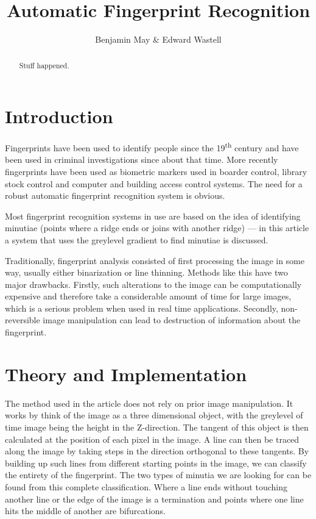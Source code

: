 \documentclass[11pt,a4paper]{article}
\title{Automatic Fingerprint Recognition}
\author{Benjamin May \& Edward Wastell}
\begin{document}
    \maketitle

    \begin{abstract}
      Stuff happened.
    \end{abstract}

    \begin{multicols}{2}

\section{Introduction}
	Fingerprints have been used to identify people since the 19\textsuperscript{th} century and have been used in criminal investigations since about that time. More recently fingerprints have been used as biometric markers used in boarder control, library stock control and computer and building access control systems. The need for a robust automatic fingerprint recognition system is obvious.

	Most fingerprint recognition systems in use are based on the idea of identifying minutiae (points where a ridge ends or joins with another ridge) --- in this article a system that uses the greylevel gradient to find minutiae is discussed.

        Traditionally, fingerprint analysis consisted of first processing the image in some way, usually either binarization or line thinning. Methods like this have two major drawbacks. Firstly, such alterations to the image can be computationally expensive and therefore take a considerable amount of time for large images, which is a serious problem when used in real time applications. Secondly, non-reversible image manipulation can lead to destruction of information about the fingerprint.


\section{Theory and Implementation}

        The method used in the article does not rely on prior image manipulation. It works by think of the image as a three dimensional object, with the greylevel of time image being the height in the Z-direction. The tangent of this object is then calculated at the position of each pixel in the image. A line can then be traced along the image by taking steps in the direction orthogonal to these tangents. By building up such lines from different starting points in the image, we can classify the entirety of the fingerprint. The two types of minutia we are looking for can be found from this complete classification. Where a line ends without touching another line or the edge of the image is a termination and points where one line hits the middle of another are bifurcations.



\end{multicols}
\end{document}
